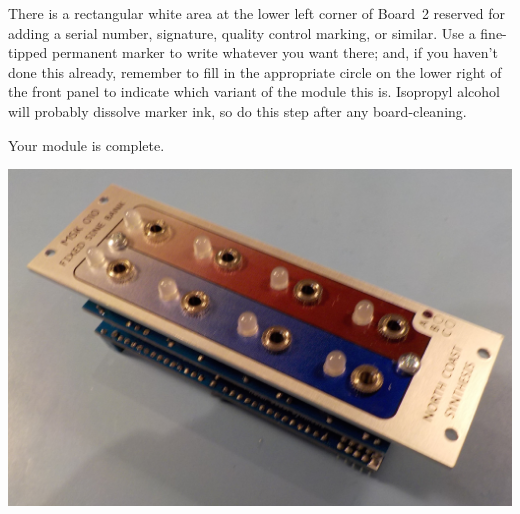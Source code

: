 There is a rectangular white area at the lower left corner of Board~2
reserved for adding a serial number, signature, quality control marking, or
similar.  Use a fine-tipped permanent marker to write whatever you want there;
and, if you haven't done this already, remember to fill in the appropriate
circle on the lower right of the front panel to indicate which variant of
the module this is.  Isopropyl alcohol will probably dissolve marker ink, so
do this step after any board-cleaning.

Your module is complete.

\noindent\includegraphics[width=\linewidth]{finished-front.jpg}
